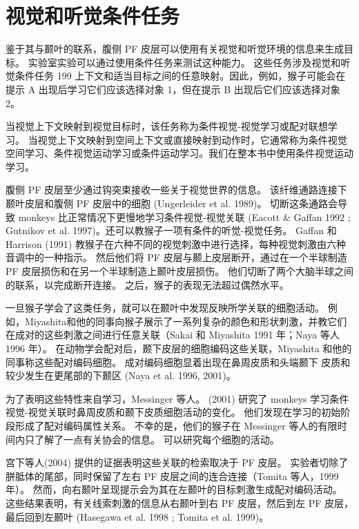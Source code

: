 \section{视觉和听觉条件任务}
\par
鉴于其与颞叶的联系，腹侧 PF 皮层可以使用有关视觉和听觉环境的信息来生成目标。 实验室实验可以通过使用条件任务来测试这种能力。 这些任务涉及视觉和听觉条件任务 199 上下文和适当目标之间的任意映射。因此，例如，猴子可能会在提示 A 出现后学习它们应该选择对象 1，但在提示 B 出现后它们应该选择对象 2。
\par
当视觉上下文映射到视觉目标时，该任务称为条件视觉-视觉学习或配对联想学习。 当视觉上下文映射到空间上下文或直接映射到动作时，它通常称为条件视觉空间学习、条件视觉运动学习或条件运动学习。我们在整本书中使用条件视觉运动学习。
\par
腹侧 PF 皮层至少通过钩突束接收一些关于视觉世界的信息。 该纤维通路连接下颞叶皮层和腹侧 PF 皮层中的细胞 (Ungerleider et al. 1989)。 切断这条通路会导致 monkeys 比正常情况下更慢地学习条件视觉-视觉关联 (Eacott \& Gaffan 1992 ; Gutnikov et al. 1997)。还可以教猴子一项有条件的听觉-视觉任务。 Gaffan 和 Harrison (1991) 教猴子在六种不同的视觉刺激中进行选择，每种视觉刺激由六种音调中的一种指示。 然后他们将 PF 皮层与颞上皮层断开，通过在一个半球制造 PF 皮层损伤和在另一个半球制造上颞叶皮层损伤。 他们切断了两个大脑半球之间的联系，以完成断开连接。 之后，猴子的表现无法超过偶然水平。
\par
一旦猴子学会了这类任务，就可以在颞叶中发现反映所学关联的细胞活动。 例如，Miyashita和他的同事向猴子展示了一系列复杂的颜色和形状刺激，并教它们在成对的这些刺激之间进行任意关联（Sakai 和 Miyashita 1991 年；Naya 等人 1996 年）。 在动物学会配对后，颞下皮层的细胞编码这些关联，Miyashita 和他的同事称这些配对编码细胞。 成对编码细胞显着出现在鼻周皮质和头端颞下
皮质和较少发生在更尾部的下颞区 (Naya et al. 1996, 2001)。
\par
为了表明这些特性来自学习，Messinger 等人。 (2001) 研究了 monkeys 学习条件视觉-视觉关联时鼻周皮质和颞下皮质细胞活动的变化。 他们发现在学习的初始阶段形成了配对编码属性关系。 不幸的是，他们的猴子在 Messinger 等人的有限时间内只了解了一点有关协会的信息。 可以研究每个细胞的活动。
\par
宫下等人(2004) 提供的证据表明这些关联的检索取决于 PF 皮层。 实验者切除了胼胝体的尾部，同时保留了左右 PF 皮层之间的连合连接（Tomita 等人，1999 年）。 然而，向右颞叶呈现提示会为其在左颞叶的目标刺激生成配对编码活动。 这些结果表明，有关线索刺激的信息从右颞叶到右 PF 皮层，然后到左 PF 皮层，最后回到左颞叶 (Hasegawa et al. 1998 ; Tomita et al. 1999)。
\par
